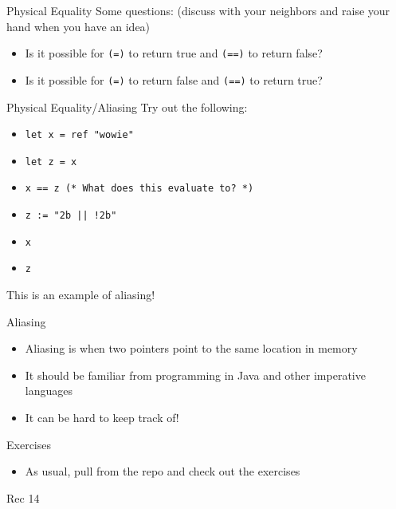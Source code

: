 \documentclass{beamer}
\begin{document}
    \begin{frame}{Physical Equality}
        Some questions: (discuss with your neighbors and raise your hand when you have an idea)
        \begin{itemize}
            \item Is it possible for \texttt{(=)} to return true and \texttt{(==)} to return false?
            \item Is it possible for \texttt{(=)} to return false and \texttt{(==)} to return true?
        \end{itemize}
    \end{frame}

    \begin{frame}[fragile=singleslide]{Physical Equality/Aliasing}
    Try out the following:
    \begin{itemize}
        \item \texttt{let x = ref "wowie"}
        \item \texttt{let z = x}
        \item \texttt{x == z (* What does this evaluate to? *)}
        \item \texttt{z := "2b || !2b"}
        \item \texttt{x}
        \item \texttt{z}
    \end{itemize}
    \pause

    This is an example of aliasing!
    \end{frame}

    \begin{frame}{Aliasing}
    \begin{itemize}
        \item Aliasing is when two pointers point to the same location in memory
        \pause
        \item It should be familiar from programming in Java and other imperative languages
        \pause
        \item It can be hard to keep track of!
    \end{itemize}
    \end{frame}

    \begin{frame}{Exercises}
    \begin{itemize}
        \item As usual, pull from the repo and check out the exercises
    \end{itemize}
    \end{frame}

    \begin{frame}{Rec 14}
    \end{frame}
\end{document}
